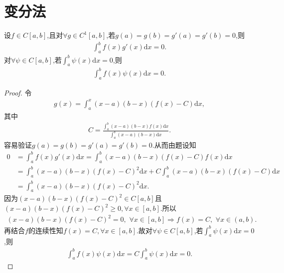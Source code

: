 \documentclass[../../main.tex]{subfiles}%
\begin{document}
\section{变分法}

\begin{example}
设$f\in C[a,b]$,且对$\forall g\in C^1[a,b]$,若$g(a)=g(b)=g'(a)=g'(b)=0$,则
\begin{align*}
\int_a^b f(x)g'(x)\mathrm{d}x=0.
\end{align*}
对$\forall \psi\in C[a,b]$,若$\int_a^b \psi(x)\mathrm{d}x=0$,则
\begin{align*}
\int_a^b f(x)\psi(x)\mathrm{d}x=0.
\end{align*}
\end{example}
\begin{proof}

令
\begin{align*}
g(x)=\int_a^x (x-a)(b-x)\left(f(x)-C\right)\mathrm{d}x,
\end{align*}
其中
\begin{align*}
C=\frac{\int_a^b (x-a)(b-x)f(x)\mathrm{d}x}{\int_a^b (x-a)(b-x)\mathrm{d}x}.
\end{align*}
容易验证$g(a)=g(b)=g'(a)=g'(b)=0$.从而由题设知
\begin{align*}
0&=\int_a^b f(x)g'(x)\mathrm{d}x=\int_a^b (x-a)(b-x)\left(f(x)-C\right)f(x)\mathrm{d}x\\
&=\int_a^b (x-a)(b-x)\left(f(x)-C\right)^2\mathrm{d}x+C\int_a^b (x-a)(b-x)\left(f(x)-C\right)\mathrm{d}x\\
&=\int_a^b (x-a)(b-x)\left(f(x)-C\right)^2\mathrm{d}x.
\end{align*}
因为$(x-a)(b-x)\left(f(x)-C\right)^2\in C[a,b]$且$(x-a)(b-x)\left(f(x)-C\right)^2\geqslant 0,\forall x\in [a,b]$.所以
\begin{align*}
(x-a)(b-x)\left(f(x)-C\right)^2=0,\,\,\forall x\in [a,b] \Longrightarrow f(x)=C,\,\,\forall x\in (a,b).
\end{align*}
再结合$f$的连续性知$f(x)=C,\forall x\in [a,b]$.故对$\forall \psi\in C[a,b]$,若$\int_a^b \psi(x)\mathrm{d}x=0$,则
\begin{align*}
\int_a^b f(x)\psi(x)\mathrm{d}x=C\int_a^b \psi(x)\mathrm{d}x=0.
\end{align*}

\end{proof}
\end{document}
